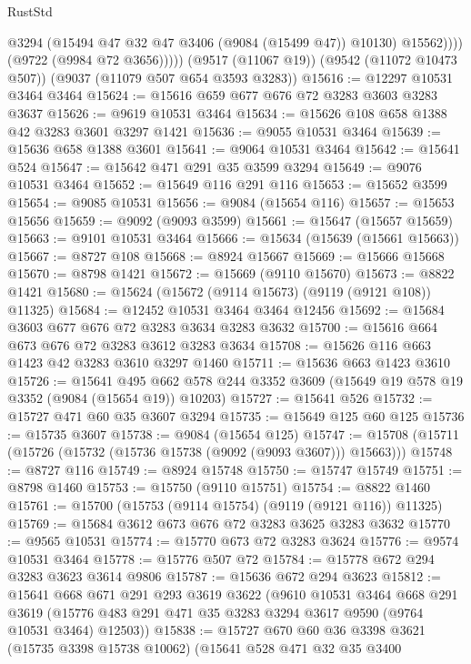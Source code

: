 \begin{lexlean}{RustStd}
\begin{coremodule}
                  @3294
                  (@15494 @47 @32 @47 @3406 (@9084 (@15499 @47)) @10130)
                  @15562))))
          (@9722 (@9984 @72 @3656)))))
    (@9517 (@11067 @19))
    (@9542 (@11072 @10473 @507))
    (@9037 (@11079 @507 @654 @3593 @3283))
@15616 := @12297 @10531 @3464 @3464
@15624 := @15616 @659 @677 @676 @72 @3283 @3603 @3283 @3637
@15626 := @9619 @10531 @3464
@15634 := @15626 @108 @658 @1388 @42 @3283 @3601 @3297 @1421
@15636 := @9055 @10531 @3464
@15639 := @15636 @658 @1388 @3601
@15641 := @9064 @10531 @3464
@15642 := @15641 @524
@15647 := @15642 @471 @291 @35 @3599 @3294
@15649 := @9076 @10531 @3464
@15652 := @15649 @116 @291 @116
@15653 := @15652 @3599
@15654 := @9085 @10531
@15656 := @9084 (@15654 @116)
@15657 := @15653 @15656
@15659 := @9092 (@9093 @3599)
@15661 := @15647 (@15657 @15659)
@15663 := @9101 @10531 @3464
@15666 := @15634 (@15639 (@15661 @15663))
@15667 := @8727 @108
@15668 := @8924 @15667
@15669 := @15666 @15668
@15670 := @8798 @1421
@15672 := @15669 (@9110 @15670)
@15673 := @8822 @1421
@15680 := @15624 (@15672 (@9114 @15673) (@9119 (@9121 @108)) @11325)
@15684 := @12452 @10531 @3464 @3464 @12456
@15692 := @15684 @3603 @677 @676 @72 @3283 @3634 @3283 @3632
@15700 := @15616 @664 @673 @676 @72 @3283 @3612 @3283 @3634
@15708 := @15626 @116 @663 @1423 @42 @3283 @3610 @3297 @1460
@15711 := @15636 @663 @1423 @3610
@15726 := @15641
    @495
    @662
    @578
    @244
    @3352
    @3609
    (@15649 @19 @578 @19 @3352 (@9084 (@15654 @19)) @10203)
@15727 := @15641 @526
@15732 := @15727 @471 @60 @35 @3607 @3294
@15735 := @15649 @125 @60 @125
@15736 := @15735 @3607
@15738 := @9084 (@15654 @125)
@15747 := @15708 (@15711 (@15726 (@15732 (@15736 @15738 (@9092 (@9093 @3607))) @15663)))
@15748 := @8727 @116
@15749 := @8924 @15748
@15750 := @15747 @15749
@15751 := @8798 @1460
@15753 := @15750 (@9110 @15751)
@15754 := @8822 @1460
@15761 := @15700 (@15753 (@9114 @15754) (@9119 (@9121 @116)) @11325)
@15769 := @15684 @3612 @673 @676 @72 @3283 @3625 @3283 @3632
@15770 := @9565 @10531
@15774 := @15770 @673 @72 @3283 @3624
@15776 := @9574 @10531 @3464
@15778 := @15776 @507 @72
@15784 := @15778 @672 @294 @3283 @3623 @3614 @9806
@15787 := @15636 @672 @294 @3623
@15812 := @15641
    @668
    @671
    @291
    @293
    @3619
    @3622
    (@9610
      @10531
      @3464
      @668
      @291
      @3619
      (@15776 @483 @291 @471 @35 @3283 @3294 @3617 @9590 (@9764 @10531 @3464) @12503))
@15838 := @15727
    @670
    @60
    @36
    @3398
    @3621
    (@15735 @3398 @15738 @10062)
    (@15641
      @528
      @471
      @32
      @35
      @3400

\end{coremodule}
\end{lexlean}
